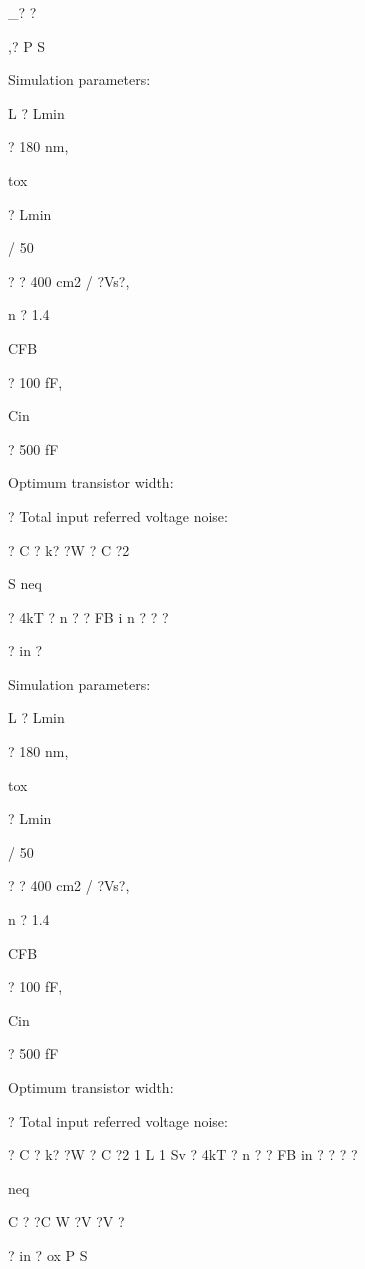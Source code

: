 \documentclass[2pt,landscape]{article}
\begin{document}
\begin{multicols*}{5}
\textbullet \textbullet \_\textbullet ?
?


\textbullet ,?	P	S











Simulation parameters:



L ? Lmin


? 180 nm,


tox


? Lmin


/ 50


? ? 400 cm2 / ?Vs?,


n ? 1.4


CFB


? 100 fF,


Cin


? 500 fF




Optimum transistor width:


?	Total input referred voltage noise:

? C	? k? ?W ? C	?2


S
neq


? 4kT ? n ? ? FB
i
n ? ?	?


?	in	?




Simulation parameters:



L ? Lmin


? 180 nm,


tox


? Lmin


/ 50


? ? 400 cm2 / ?Vs?,


n ? 1.4


CFB


? 100 fF,


Cin


? 500 fF



Optimum transistor width:

?	Total input referred voltage noise:

? C	? k? ?W ? C	?2	1	L	1
Sv	? 4kT ? n ? ?   FB	in ? ?	?	?


neq


C	? ?C	W	?V ?V ?


?	in	?	ox	P	S





\end{multicols*}
\end{document}
